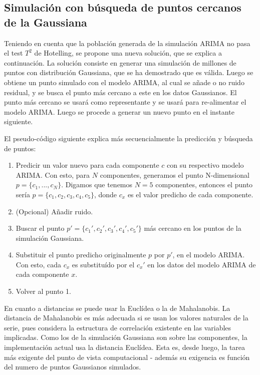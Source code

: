 \documentclass[11pt,spanish,listoffigures,listoftables]{tfgetsinf}
\begin{document}
        
        \subsection{Simulación con búsqueda de puntos cercanos de la Gaussiana}
        Teniendo en cuenta que la población generada de la simulación ARIMA no pasa el test \(T^2\) de Hotelling, se propone una nueva solución, que se explica a continuación. La solución consiste en generar una simulación de millones de puntos con distribución Gaussiana, que se ha demostrado que es válida. Luego se obtiene un punto simulado con el modelo ARIMA, al cual se añade o no ruido residual, y se busca el punto más cercano a este en los datos Gaussianos. El punto más cercano se usará como representante y se usará para re-alimentar el modelo ARIMA. Luego se procede a generar un nuevo punto en el instante siguiente.
        
        El pseudo-código siguiente explica más secuencialmente la predicción y búsqueda de puntos: 
        \begin{enumerate}
        \item Predicir un valor nuevo para cada componente \(c\) con su respectivo modelo ARIMA. Con esto, para \(N\) componentes, generamos el punto N-dimensional \(p = \{c_{1}, ..., c_{N}\}\). Digamos que tenemos \(N=5\) componentes, entonces el punto sería \(p = \{c_{1}, c_{2}, c_{3}, c_{4}, c_{5}\}\), donde \(c_{x}\) es el valor predicho de cada componente.
        \item (Opcional) Añadir ruido.
        \item Buscar el punto \(p' = \{c_{1}', c_{2}', c_{3}', c_{4}', c_{5}'\}\) más cercano en los puntos de la simulación Gaussiana.
        \item Substituir el punto predicho originalmente \(p\) por \(p'\), en el modelo ARIMA. Con esto, cada \(c_{x}\) es substituído por el \(c_{x}'\) en los datos del modelo ARIMA de cada componente \(x\).
        \item Volver al punto 1.
        \end{enumerate}

	En cuanto a distancias se puede usar la Euclídea o la de Mahalanobis. La distancia de Mahalanobis es más adecuada si se usan los valores naturales de la serie, pues considera la estructura de correlación existente en las variables implicadas. Como los de la simulación Gaussiana son sobre las componentes, la implementación actual usa la distancia Euclídea. Esta es, desde luego, la tarea más exigente del punto de vista computacional - además su exigencia es función del numero de puntos Gaussianos simulados.
	
\end{document}
